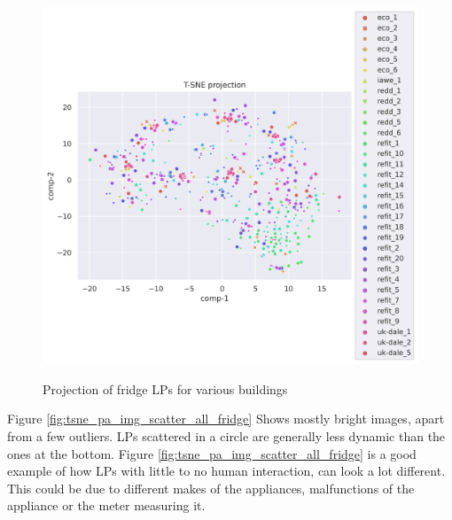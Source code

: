 \begin{figure}[H]
	\centering
	\caption{Projection of fridge LPs for various buildings}
	\includegraphics[width=1.2\textwidth]{Figures/TSNE/TSNE_per_appliance/all/scatter_all_fridge_freeezer_fridge freezer.png}
	\label{fig:tsne_pa_scatter_all_fridge}
\end{figure}

Figure \ref{fig:tsne_pa_img_scatter_all_fridge} Shows mostly bright images, apart from a few outliers.
LPs scattered in a circle are generally less dynamic than the ones at the bottom.
Figure \ref{fig:tsne_pa_img_scatter_all_fridge} is a good example of how LPs with little to no human interaction, can look a lot different. 
This could be due to different makes of the appliances, malfunctions of the appliance or the meter measuring it.

